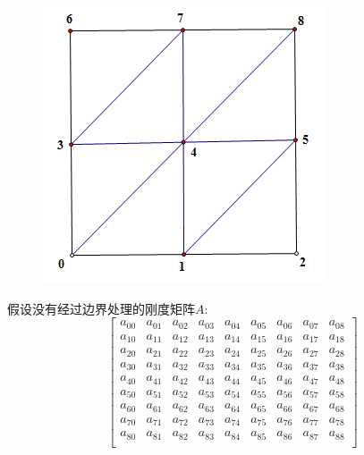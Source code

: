 \documentclass[12pt,a4paper]{article}
\begin{document}
\begin{figure}[H]
\centering
\includegraphics[scale=0.5]{./figures/2.png}
\caption{}
\end{figure}

假设没有经过边界处理的刚度矩阵$A$:
$$
\begin{bmatrix}
a_{00} & a_{01} & a_{02} & a_{03} & a_{04} & a_{05} & a_{06} & a_{07} & a_{08}\\
a_{10} & a_{11} & a_{12} & a_{13} & a_{14} & a_{15} & a_{16} & a_{17} & a_{18}\\
a_{20} & a_{21} & a_{22} & a_{23} & a_{24} & a_{25} & a_{26} & a_{27} & a_{28}\\
a_{30} & a_{31} & a_{32} & a_{33} & a_{34} & a_{35} & a_{36} & a_{37} & a_{38}\\
a_{40} & a_{41} & a_{42} & a_{43} & a_{44} & a_{45} & a_{46} & a_{47} & a_{48}\\
a_{50} & a_{51} & a_{52} & a_{53} & a_{54} & a_{55} & a_{56} & a_{57} & a_{58}\\
a_{60} & a_{61} & a_{62} & a_{63} & a_{64} & a_{65} & a_{66} & a_{67} & a_{68}\\
a_{70} & a_{71} & a_{72} & a_{73} & a_{74} & a_{75} & a_{76} & a_{77} & a_{78}\\
a_{80} & a_{81} & a_{82} & a_{83} & a_{84} & a_{85} & a_{86} & a_{87} & a_{88}\\
\end{bmatrix}
$$
\end{document}
